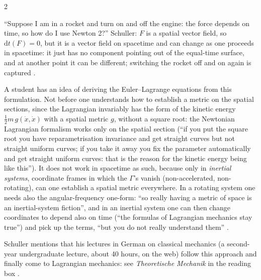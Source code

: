 \begin{paracol}{2}
\begin{coursenote}
``Suppose I am in a rocket and turn on and off the engine: the force depends on time, so how do I use Newton 2?'' Schuller: $F$ is a spatial vector field, so $\mathrm dt(F)=0$, but it is a vector field on spacetime and can change as one proceeds in spacetime: it just has no component pointing out of the equal-time surface, and at another point it can be different; switching the rocket off and on again is captured .
\end{coursenote}
\begin{coursenote}
A student has an idea of deriving the Euler--Lagrange equations from this formulation. Not before one understands how to establish a metric on the spatial sections, since the Lagrangian invariably has the form of the kinetic energy $\tfrac12m\,g(\dot x,\dot x)$ with a spatial metric $g$, without a square root: the Newtonian Lagrangian formalism works only on the spatial section (``if you put the square root you have reparametrisation invariance and get straight curves but not straight uniform curves; if you take it away you fix the parameter automatically and get straight uniform curves: that is the reason for the kinetic energy being like this''). It does not work in spacetime as such, because only in \emph{inertial systems}, coordinate frames in which the $\Gamma$'s vanish (non-accelerated, non-rotating), can one establish a spatial metric everywhere. In a rotating system one needs also the angular-frequency one-form: ``so really having a metric of space is an inertial-system fiction'', and in an inertial system one can then change coordinates to depend also on time (``the formulas of Lagrangian mechanics stay true'') and pick up the terms, ``but you do not really understand them'' .
\end{coursenote}
Schuller mentions that his lectures in German on classical mechanics (a second-year undergraduate lecture, about 40 hours, on the web) follow this approach and finally come to Lagrangian mechanics: see \emph{Theoretische Mechanik} in the reading box .


\end{paracol}
